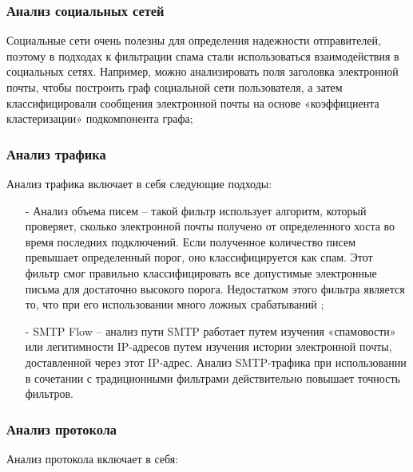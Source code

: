 \subsubsection{Анализ социальных сетей}
    Социальные сети очень полезны для определения 
    надежности отправителей, поэтому в подходах к фильтрации спама стали использоваться 
    взаимодействия в социальных сетях. Например, можно анализировать поля заголовка 
    электронной почты, чтобы построить граф социальной сети пользователя, а затем классифицировали 
    сообщения электронной почты на основе «коэффициента кластеризации» подкомпонента графа;

\subsubsection{Анализ трафика}

    Анализ трафика включает в себя следующие подходы:

    \begin{itemize}
        \item[-] Анализ объема писем -- такой фильтр использует алгоритм, который проверяет, 
        сколько электронной почты получено от определенного хоста во время последних 
        подключений. Если полученное количество писем превышает определенный порог, 
        оно классифицируется как спам. Этот фильтр смог правильно классифицировать 
        все допустимые электронные письма для достаточно высокого порога. Недостатком 
        этого фильтра является то, что при его использовании много ложных срабатываний \cite{IFIP};
        \item[-] SMTP Flow -- анализ пути SMTP работает путем изучения «спамовости» или легитимности 
        IP-адресов путем изучения истории электронной почты, доставленной через этот IP-адрес. 
        Анализ SMTP-трафика при использовании в сочетании с традиционными фильтрами 
        действительно повышает точность фильтров.
    \end{itemize}

\subsubsection{Анализ протокола}

    Анализ протокола включает в себя:

